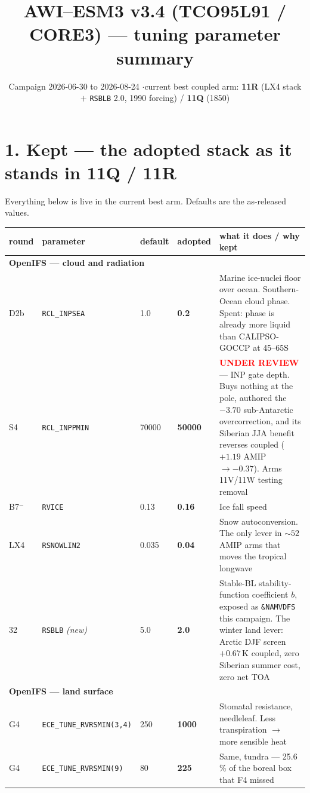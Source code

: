 \documentclass[9pt,a4paper]{article}
\title{\vspace{-1.4cm}\textbf{AWI--ESM3 v3.4 (TCO95L91 / CORE3) --- tuning parameter summary}}
\author{Campaign 2026-06-30 to 2026-08-24 \quad$\cdot$\quad current best coupled arm: \textbf{11R}
 (LX4 stack $+$ \texttt{RSBLB} 2.0, 1990 forcing) / \textbf{11Q} (1850)}
\date{}
\begin{document}
\maketitle\vspace{-8mm}

\section*{1. Kept --- the adopted stack as it stands in 11Q / 11R}
Everything below is live in the current best arm. Defaults are the as-released values.

\begin{center}\footnotesize
\begin{longtable}{p{} p{} p{} p{} p{}}
\toprule
round & parameter & default & adopted & what it does / why kept \\
\midrule\endhead
\multicolumn{5}{l}{\textbf{OpenIFS --- cloud and radiation}}\\
D2b & \texttt{RCL\_INPSEA} & 1.0 & \textbf{0.2} & Marine ice-nuclei floor over ocean. Southern-Ocean cloud phase. Spent: phase is already more liquid than CALIPSO-GOCCP at 45--65S \\
S4 & \texttt{RCL\_INPPMIN} & 70000 & \textbf{50000} & \textcolor{red}{\textbf{UNDER REVIEW}} --- INP gate depth. Buys nothing at the pole, authored the $-3.70$ sub-Antarctic overcorrection, and its Siberian JJA benefit reverses coupled ($+1.19$ AMIP $\to-0.37$). Arms 11V/11W testing removal \\
B7$^{-}$ & \texttt{RVICE} & 0.13 & \textbf{0.16} & Ice fall speed \\
LX4 & \texttt{RSNOWLIN2} & 0.035 & \textbf{0.04} & Snow autoconversion. The only lever in ${\sim}52$ AMIP arms that moves the tropical longwave \\
32 & \texttt{RSBLB} \emph{(new)} & 5.0 & \textbf{2.0} & Stable-BL stability-function coefficient $b$, exposed as \texttt{\&NAMVDFS} this campaign. The winter land lever: Arctic DJF screen $+0.67$\,K coupled, zero Siberian summer cost, zero net TOA \\
\midrule
\multicolumn{5}{l}{\textbf{OpenIFS --- land surface}}\\
G4 & \texttt{ECE\_TUNE\_RVRSMIN(3,4)} & 250 & \textbf{1000} & Stomatal resistance, needleleaf. Less transpiration $\to$ more sensible heat \\
G4 & \texttt{ECE\_TUNE\_RVRSMIN(9)} & 80 & \textbf{225} & Same, tundra --- 25.6\,\% of the boreal box that F4 missed \\

\end{longtable}
\end{center}
\end{document}

